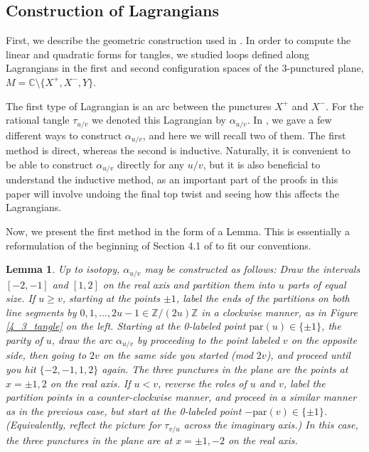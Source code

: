 \documentclass[11pt]{amsart}
\theoremstyle{plain}
\newtheorem{lemmaN}[theoremN]{Lemma}
\theoremstyle{definition}
\theoremstyle{remark}
\begin{document}
\subsection{Construction of Lagrangians}
\label{TangleLsection}

First, we describe the geometric construction used in \cite{JHpI26}. In order to compute the linear and quadratic forms for tangles, we studied loops defined along Lagrangians in the first and second configuration spaces of the 3-punctured plane, $M=\mathbb{C}\setminus\{X^+,X^-,Y\}$.

The first type of Lagrangian is an arc between the punctures $X^+$ and $X^-$. For the rational tangle $\tau_{u/v}$ we denoted this Lagrangian by $\alpha_{u/v}$. In \cite{JHpI26}, we gave a few different ways to construct $\alpha_{u/v}$, and here we will recall two of them. The first method is direct, whereas the second is inductive. Naturally, it is convenient to be able to construct $\alpha_{u/v}$ directly for any $u/v$, but it is also beneficial to understand the inductive method, as an important part of the proofs in this paper will involve undoing the final top twist and seeing how this affects the Lagrangians. 

Now, we present the first method in the form of a Lemma. This is essentially a reformulation of the beginning of Section 4.1 of \cite{W16} to fit our conventions.

\begin{lemmaN}
\label{bridgerecipe}
    Up to isotopy, $\alpha_{u/v}$ may be constructed as follows:
    Draw the intervals $[-2,-1]$ and $[1,2]$ on the real axis and partition them into $u$ parts of equal size. If $u\geq v$, starting at the points $\pm1$, label the ends of the partitions on both line segments by $0,1,...,2u-1\in \mathbb{Z}/(2u)\mathbb{Z}$ in a clockwise manner, as in Figure \ref{4_3_tangle} on the left. Starting at the 0-labeled point $\text{par}(u)\in\{\pm1\}$, the parity of $u$, draw the arc $\alpha_{u/v}$ by proceeding to the point labeled $v$ on the opposite side, then going to $2v$ on the same side you started (mod $2v$), and proceed until you hit $\{-2,-1,1,2\}$ again. The three punctures in the plane are the points at $x=\pm1, 2$ on the real axis. If $u<v$, reverse the roles of $u$ and $v$, label the partition points in a counter-clockwise manner, and proceed in a similar manner as in the previous case, but start at the 0-labeled point $-\text{par}(v)\in\{\pm1\}$. (Equivalently, reflect the picture for $\tau_{v/u}$ across the imaginary axis.) In this case, the three punctures in the plane are at $x=\pm1,-2$ on the real axis.
\end{lemmaN}
\end{document}
